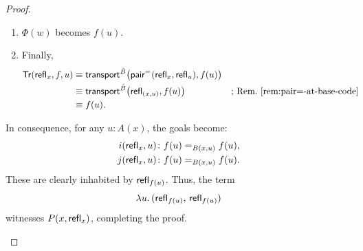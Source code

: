 \begin{proof}
\begin{description}[font=\normalfont\scshape]
\begin{enumerate}[-]
            \item $\Phi(w)$ becomes $f(u)$.
    
            \item Finally,
            \begin{align*}
                \mathsf{Tr}(\mathsf{refl}_x,f,u)
                &\equiv\mathsf{transport}^{\hat B}
                \bigl(
                    \mathsf{pair}^{\mathrel{=_{}}}(\mathsf{refl}_x,\mathsf{refl}_u),
                    f(u)
                \bigr)\\
                &\equiv\mathsf{transport}^{\hat B}
                    \big(\mathsf{refl}_{(x,u)},f(u)\big)
                        &&\text{; Rem.~\ref{rem:pair=-at-base-code}}\\
                &\equiv f(u).
            \end{align*}
        \end{enumerate}
        In consequence, for any $u\colon A(x)$, the goals become:
        \begin{align*}
            i(\fun{refl}_x,u)&\colon f(u)\eq{B(x,u)}f(u),\\
            j(\fun{refl}_x,u) &\colon f(u)\eq{B(x,u)}f(u).
        \end{align*}
        These are clearly inhabited by $\mathsf{refl}_{f(u)}$.
        Thus, the term
        \[
            \lambda u.\,(\mathsf{refl}_{f(u)},\, \mathsf{refl}_{f(u)})
        \]
        witnesses $P(x,\mathsf{refl}_x)$, completing the proof.\qedhere
    \end{description}
\end{proof}

